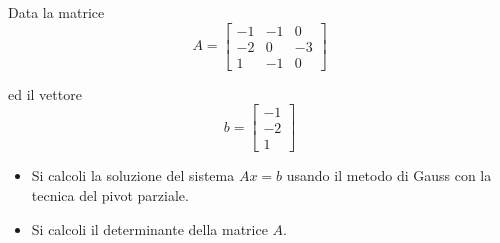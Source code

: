 Data la matrice
\bigskip
\[
A=\left[
\begin{array}{ccc}
-1 & -1 & 0 \\
-2 & 0 & -3\\
1 & -1 & 0
\end{array}\right]
\]

ed il vettore
\bigskip
\[
b=\left[
\begin{array}{ccc}
-1\\
-2 \\
1
\end{array}\right]
\]
\begin{itemize}
\item Si calcoli la soluzione del sistema $Ax=b$ usando il metodo
di Gauss con la tecnica del pivot parziale.
\item Si calcoli il determinante della matrice $A$.
\end{itemize}
